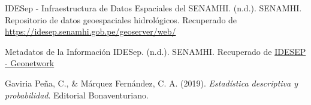\documentclass{article}
\begin{document}
\begin{thebibliography}{9}

  IDESep - Infraestructura de Datos Espaciales del SENAMHI. (n.d.). SENAMHI. Repositorio de datos geoespaciales hidrológicos. Recuperado de \url{https://idesep.senamhi.gob.pe/geoserver/web/}
  
  Metadatos de la Información IDESep. (n.d.). SENAMHI. Recuperado de \href{https://idesep.senamhi.gob.pe/geonetwork/srv/spa/catalog.search#/metadata/d6e9a47a-2b78-4f8e-ad07-2c3e6f8f7b9e}{IDESEP - Geonetwork}

  Gaviria Peña, C., \& Márquez Fernández, C. A. (2019). \textit{Estadística descriptiva y probabilidad}. Editorial Bonaventuriano. 

\end{thebibliography}
  
\end{document}
